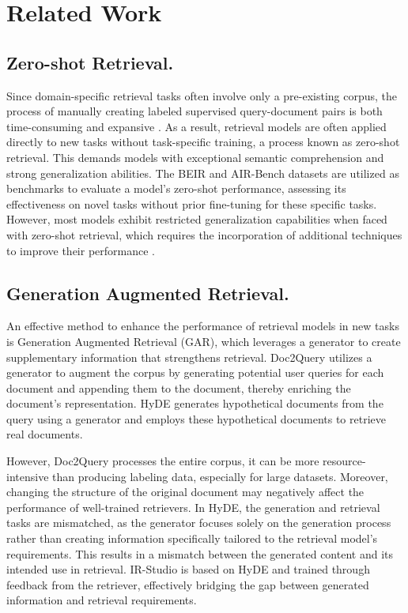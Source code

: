 \section{Related Work}

\subsection{Zero-shot Retrieval.}

Since domain-specific retrieval tasks often involve only a pre-existing corpus, the process of manually creating labeled supervised query-document pairs is both time-consuming and expansive \cite{thakur2021beir}. As a result, retrieval models are often applied directly to new tasks without task-specific training, a process known as zero-shot retrieval. This demands models with exceptional semantic comprehension and strong generalization abilities. The BEIR \cite{thakur2021beir} and AIR-Bench \cite{chen2024air} datasets are utilized as benchmarks to evaluate a model's zero-shot performance, assessing its effectiveness on novel tasks without prior fine-tuning for these specific tasks. However, most models exhibit restricted generalization capabilities when faced with zero-shot retrieval, which requires the incorporation of additional techniques to improve their performance \cite{gao2022precise, wang2021gpl}.

\subsection{Generation Augmented Retrieval.}

An effective method to enhance the performance of retrieval models in new tasks is Generation Augmented Retrieval (GAR), which leverages a generator to create supplementary information that strengthens retrieval. Doc2Query \cite{nogueira2019document} utilizes a generator to augment the corpus by generating potential user queries for each document and appending them to the document, thereby enriching the document's representation. HyDE \cite{gao2022precise} generates hypothetical documents from the query using a generator and employs these hypothetical documents to retrieve real documents.

However, Doc2Query processes the entire corpus, it can be more resource-intensive than producing labeling data, especially for large datasets. Moreover, changing the structure of the original document may negatively affect the performance of well-trained retrievers. In HyDE, the generation and retrieval tasks are mismatched, as the generator focuses solely on the generation process rather than creating information specifically tailored to the retrieval model's requirements. This results in a mismatch between the generated content and its intended use in retrieval.
IR-Studio is based on HyDE and trained through feedback from the retriever, effectively bridging the gap between generated information and retrieval requirements.

